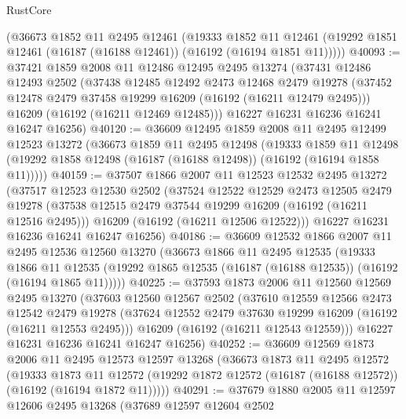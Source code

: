 \begin{lexlean}{RustCore}
\begin{coremodule}
    (@36673
      @1852
      @11
      @2495
      @12461
      (@19333
        @1852
        @11
        @12461
        (@19292 @1851 @12461 (@16187 (@16188 @12461)) (@16192 (@16194 @1851 @11)))))
@40093 := @37421
    @1859
    @2008
    @11
    @12486
    @12495
    @2495
    @13274
    (@37431
      @12486
      @12493
      @2502
      (@37438
        @12485
        @12492
        @2473
        @12468
        @2479
        @19278
        (@37452 @12478 @2479 @37458 @19299 @16209 (@16192 (@16211 @12479 @2495)))
        @16209
        (@16192 (@16211 @12469 @12485)))
      @16227
      @16231
      @16236
      @16241
      @16247
      @16256)
@40120 := @36609
    @12495
    @1859
    @2008
    @11
    @2495
    @12499
    @12523
    @13272
    (@36673
      @1859
      @11
      @2495
      @12498
      (@19333
        @1859
        @11
        @12498
        (@19292 @1858 @12498 (@16187 (@16188 @12498)) (@16192 (@16194 @1858 @11)))))
@40159 := @37507
    @1866
    @2007
    @11
    @12523
    @12532
    @2495
    @13272
    (@37517
      @12523
      @12530
      @2502
      (@37524
        @12522
        @12529
        @2473
        @12505
        @2479
        @19278
        (@37538 @12515 @2479 @37544 @19299 @16209 (@16192 (@16211 @12516 @2495)))
        @16209
        (@16192 (@16211 @12506 @12522)))
      @16227
      @16231
      @16236
      @16241
      @16247
      @16256)
@40186 := @36609
    @12532
    @1866
    @2007
    @11
    @2495
    @12536
    @12560
    @13270
    (@36673
      @1866
      @11
      @2495
      @12535
      (@19333
        @1866
        @11
        @12535
        (@19292 @1865 @12535 (@16187 (@16188 @12535)) (@16192 (@16194 @1865 @11)))))
@40225 := @37593
    @1873
    @2006
    @11
    @12560
    @12569
    @2495
    @13270
    (@37603
      @12560
      @12567
      @2502
      (@37610
        @12559
        @12566
        @2473
        @12542
        @2479
        @19278
        (@37624 @12552 @2479 @37630 @19299 @16209 (@16192 (@16211 @12553 @2495)))
        @16209
        (@16192 (@16211 @12543 @12559)))
      @16227
      @16231
      @16236
      @16241
      @16247
      @16256)
@40252 := @36609
    @12569
    @1873
    @2006
    @11
    @2495
    @12573
    @12597
    @13268
    (@36673
      @1873
      @11
      @2495
      @12572
      (@19333
        @1873
        @11
        @12572
        (@19292 @1872 @12572 (@16187 (@16188 @12572)) (@16192 (@16194 @1872 @11)))))
@40291 := @37679
    @1880
    @2005
    @11
    @12597
    @12606
    @2495
    @13268
    (@37689
      @12597
      @12604
      @2502

\end{coremodule}
\end{lexlean}
